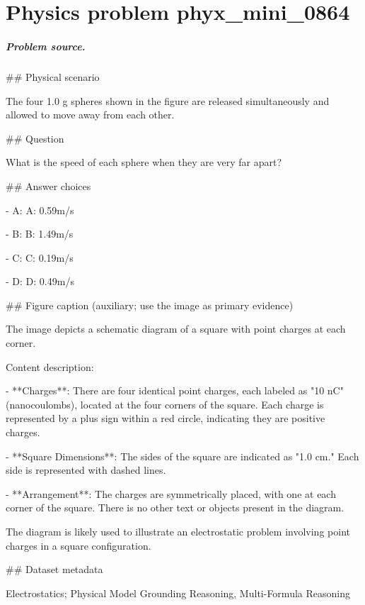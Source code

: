 
\chapter{Physics problem phyx\_mini\_0864}
\label{ch:PhyXMiniProblems_problem_phyx_mini_0864}

\paragraph{Problem source.}
\#\# Physical scenario

The four 1.0 g spheres shown in the figure are released simultaneously and allowed to move away from each other.

\#\# Question

What is the speed of each sphere when they are very far apart?

\#\# Answer choices

- A: A: 0.59m/s

- B: B: 1.49m/s

- C: C: 0.19m/s

- D: D: 0.49m/s

\#\# Figure caption (auxiliary; use the image as primary evidence)

The image depicts a schematic diagram of a square with point charges at each corner. 

Content description:

- **Charges**: There are four identical point charges, each labeled as "10 nC" (nanocoulombs), located at the four corners of the square. Each charge is represented by a plus sign within a red circle, indicating they are positive charges.

- **Square Dimensions**: The sides of the square are indicated as "1.0 cm." Each side is represented with dashed lines.

- **Arrangement**: The charges are symmetrically placed, with one at each corner of the square. There is no other text or objects present in the diagram.

The diagram is likely used to illustrate an electrostatic problem involving point charges in a square configuration.

\#\# Dataset metadata

Electrostatics; Physical Model Grounding Reasoning, Multi-Formula Reasoning

